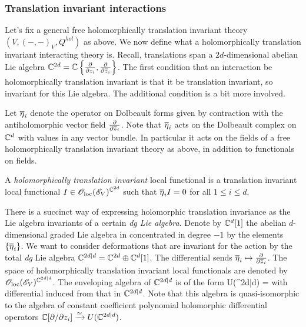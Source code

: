 \documentclass[10pt]{amsart}
\begin{document}
\subsubsection{Translation invariant interactions}


Let's fix a general free holomorphically translation invariant theory $(V, (-,-)_V, Q^{hol})$ as above.
We now define what a holomorphically translation invariant interacting theory is.
Recall, translations span a $2d$-dimensional abelian Lie algebra $\CC^{2d} = \CC\left\{\frac{\partial}{\partial z_i}, \frac{\partial}{\partial \zbar_i}\right\}$. 
The first condition that an interaction be holomorphically translation invariant is that it be translation invariant, so invariant for this Lie algebra.
The additional condition is a bit more involved.

Let $\Bar{\eta}_i$ denote the operator on Dolbeault forms given by contraction with the antiholomorphic vector field $\frac{\partial}{\partial \zbar_i}$. 
Note that $\Bar{\eta}_i$ acts on the Dolbeault complex on $\CC^d$ with values in any vector bundle.
In particular it acts on the fields of a free holomorphically translation invariant theory as above, in addition to functionals on fields.

\begin{dfn}
A {\em holomorphically translation invariant} local functional is a translation invariant local functional $I \in \oloc(\sE_V)^{\CC^{2d}}$ such that $\Bar{\eta}_i I = 0$ for all $1 \leq i \leq d$. 
\end{dfn}

There is a succinct way of expressing holomorphic translation invariance as the Lie algebra invariants of a certain {\em dg Lie algebra}.
Denote by $\CC^d[1]$ the abelian $d$-dimensional graded Lie algebra in concentrated in degree $-1$ by the elements $\{\Bar{\eta}_i\}$.
We want to consider deformations that are invariant for the action by the total {\em dg} Lie algebra $\CC^{2d|d} = \CC^{2d} \oplus \CC^d[1]$.
The differential sends $\Bar{\eta}_i \mapsto \frac{\partial}{\partial \zbar_i}$.
The space of holomorphically translation invariant local functionals are denoted by $\oloc(\sE_V)^{\CC^{2d|d}}$.
The enveloping algebra of $\CC^{2d|d}$ is of the form
\ben
U(\CC^{2d|d}) = \CC {}
\een
with differential induced from that in $\CC^{2d|d}$. 
Note that this algebra is quasi-isomorphic to the algebra of constant coefficient polynomial holomorphic differential operators $\CC[\partial / \partial z_i] \xto{\simeq} U(\CC^{2d|d})$. 
\end{document}
